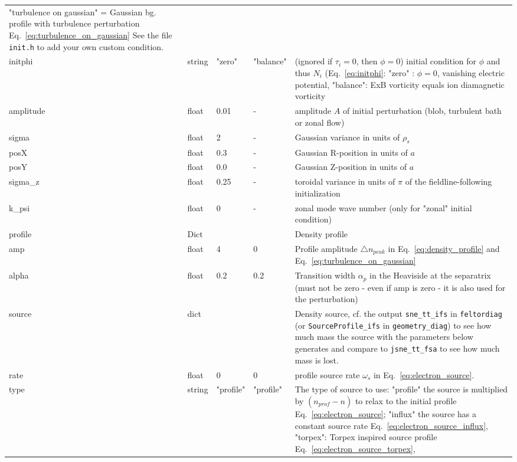 \begin{longtable}{llllp{6cm}}
    "turbulence on gaussian" = Gaussian bg. profile with turbulence perturbation Eq.~\eqref{eq:turbulence_on_gaussian}
    See the file {\tt init.h} to add your own custom condition.
\\
initphi   & string & "zero"  & "balance" & (ignored if $\tau_i = 0$, then $\phi=0$) initial condition for $\phi$ and thus $N_i$ (Eq.~\eqref{eq:initphi}: "zero" : $\phi = 0$, vanishing
electric potential, "balance": ExB vorticity equals ion diamagnetic vorticity
\\
amplitude  & float &0.01   & - & amplitude $A$ of initial perturbation (blob, turbulent bath or zonal flow)  \\
sigma      & float &2      & - & Gaussian variance in units of $\rho_s$ \\
posX       & float &0.3    & - & Gaussian R-position in units of $a$\\
posY       & float &0.0    & - & Gaussian Z-position in units of $a$ \\
sigma\_z    & float &0.25   & - & toroidal variance in units of $\pi$ of the fieldline-following initialization \\
k\_psi     & float &0    & - & zonal mode wave number (only for "zonal" initial condition)  \\
profile & Dict & & & Density profile \\
\qquad amp& float &4   & 0 & Profile amplitude $\triangle n_{peak}$ in
Eq.~\eqref{eq:density_profile} and Eq.~\eqref{eq:turbulence_on_gaussian}
\\
\qquad alpha  & float & 0.2 & 0.2 & Transition width $\alpha_p$ in the Heaviside
at the separatrix (must not be zero - even if amp is zero - it is also used for the perturbation)
\\
source & dict & & & Density source, cf. the output \texttt{sne\_tt\_ifs} in \texttt{feltordiag} (or \texttt{SourceProfile\_ifs} in \texttt{geometry\_diag}) to see how much mass the source with the parameters below generates and compare to \texttt{jsne\_tt\_fsa} to see how much mass is lost.  \\
\qquad rate & float & 0    & 0 & profile source rate $\omega_s$ in Eq.~\eqref{eq:electron_source}.
\\
\qquad type & string & "profile" & "profile" & The type of source to use: "profile" the source is multiplied by $(n_{prof} - n)$ to relax to the initial profile Eq.~\eqref{eq:electron_source};
"influx" the source has a constant source rate Eq.~\eqref{eq:electron_source_influx},
"torpex": Torpex inspired source profile Eq.~\eqref{eq:electron_source_torpex},

\end{longtable}
